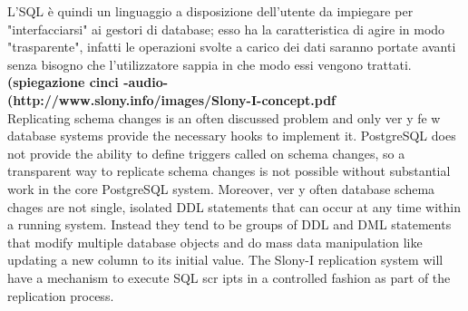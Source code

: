 L'SQL è quindi un linguaggio a disposizione dell'utente da impiegare per "interfacciarsi" ai gestori di database; esso ha la caratteristica di agire in modo "trasparente", infatti le operazioni svolte a carico dei dati saranno portate avanti senza bisogno che l'utilizzatore sappia in che modo essi vengono trattati.\\
\textbf{(spiegazione cinci -audio-}\\
\textbf{(http://www.slony.info/images/Slony-I-concept.pdf}\\
Replicating schema changes is an often discussed problem and only ver y
fe w database systems provide the necessary hooks to implement it. PostgreSQL
does not provide the ability to define triggers called on schema changes, so a
transparent way to replicate schema changes is not possible without substantial
work in the core PostgreSQL system.
Moreover, ver y often database schema chages are not single, isolated DDL
statements that can occur at any time within a running system. Instead they tend
to be groups of DDL and DML statements that modify multiple database objects
and do mass data manipulation like updating a new column to its initial value.
The Slony-I replication system will have a mechanism to execute SQL
scr ipts in a controlled fashion as part of the replication process.

\item
